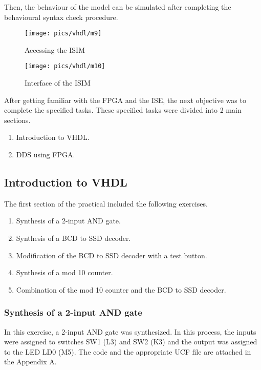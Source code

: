 \noindent
Then, the behaviour of the model can be simulated after completing the behavioural syntax check procedure.

\begin{figure}[!h]
	\centering
	\texttt{[image: pics/vhdl/m9]}
	\caption{Accessing the ISIM}
	\label{fig:m8}
\end{figure}
 
\begin{figure}[!h]
	\centering
	\texttt{[image: pics/vhdl/m10]}
	\caption{Interface of the ISIM}
	\label{fig:m10}
\end{figure}
 
\pagebreak

\noindent
After getting familiar with the FPGA and the ISE, the next objective was to complete the specified tasks. These specified tasks were  divided into 2 main sections.

\begin{enumerate}
	\item Introduction to VHDL.
	\item DDS using FPGA.
\end{enumerate}

\subsection{Introduction to VHDL}

\noindent
The first section of the practical included the following exercises.
 
\begin{enumerate}
	\item Synthesis of a 2-input AND gate.
	\item Synthesis of a BCD to SSD decoder.
	\item Modification of the BCD to SSD decoder with a test button.
	\item Synthesis of a mod 10 counter.
	\item Combination of the mod 10 counter and the BCD to SSD decoder.
\end{enumerate}

\subsubsection{Synthesis of a 2-input AND gate}

\noindent
In this exercise, a 2-input AND gate was synthesized. In this process, the inputs were assigned to switches SW1 (L3) and SW2 (K3) and the output was assigned to the LED LD0 (M5). The  code and the appropriate UCF file are attached in the Appendix A. 


